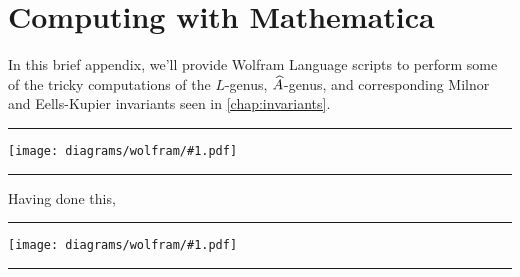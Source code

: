 \newcommand{\wolfram}[1]{
  \noindent
  \begin{center}\rule{\textwidth}{1.2pt}\end{center}
  \texttt{[image: diagrams/wolfram/\#1.pdf]}
  \vspace{-1em}
  \begin{center}\rule{\textwidth}{1.2pt}\end{center}
}

\chapter{Computing with Mathematica}\label{sec:wolfram}

In this brief appendix, we'll provide Wolfram Language scripts to perform some of the tricky computations of the $L$-genus, $\widehat{A}$-genus, and corresponding Milnor and Eells-Kupier invariants seen in \cref{chap:invariants}.

\wolfram{multseq}

Having done this,

\wolfram{characteristic}
